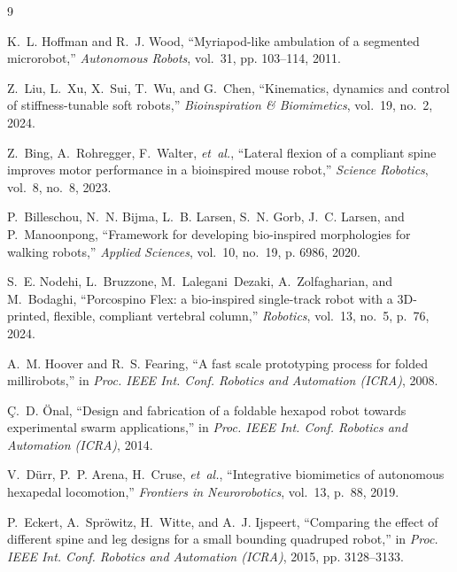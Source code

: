\documentclass[11pt, letterpaper]{article}
\begin{document}

\begin{thebibliography}{9}

K.~L. Hoffman and R.~J. Wood, ``Myriapod-like ambulation of a segmented
  microrobot,'' \emph{Autonomous Robots}, vol.~31, pp. 103--114, 2011.

Z.~Liu, L.~Xu, X.~Sui, T.~Wu, and G.~Chen, ``Kinematics, dynamics and control
  of stiffness-tunable soft robots,'' \emph{Bioinspiration \& Biomimetics},
  vol.~19, no.~2, 2024.

Z.~Bing, A.~Rohregger, F.~Walter, \emph{et~al.}, ``Lateral flexion of a
  compliant spine improves motor performance in a bioinspired mouse robot,''
  \emph{Science Robotics}, vol.~8, no.~8, 2023.

P.~Billeschou, N.~N. Bijma, L.~B. Larsen, S.~N. Gorb, J.~C. Larsen, and
  P.~Manoonpong, ``Framework for developing bio-inspired morphologies for
  walking robots,'' \emph{Applied Sciences}, vol.~10, no.~19, p. 6986, 2020.

S.~E. Nodehi, L.~Bruzzone, M.~Lalegani~Dezaki, A.~Zolfagharian, and M.~Bodaghi,
  ``Porcospino Flex: a bio-inspired single-track robot with a 3D-printed,
  flexible, compliant vertebral column,'' \emph{Robotics}, vol.~13, no.~5,
  p.~76, 2024.

A.~M. Hoover and R.~S. Fearing, ``A fast scale prototyping process for folded
  millirobots,'' in \emph{Proc. IEEE Int. Conf. Robotics and Automation
  (ICRA)}, 2008.

{\c{C}}.~D. \"{O}nal, ``Design and fabrication of a foldable hexapod robot
  towards experimental swarm applications,'' in \emph{Proc. IEEE Int. Conf.
  Robotics and Automation (ICRA)}, 2014.

V.~D{\"u}rr, P.~P. Arena, H.~Cruse, \emph{et~al.}, ``Integrative biomimetics of
  autonomous hexapedal locomotion,'' \emph{Frontiers in Neurorobotics},
  vol.~13, p.~88, 2019.

P.~Eckert, A.~Spr{\"o}witz, H.~Witte, and A.~J. Ijspeert, ``Comparing the
  effect of different spine and leg designs for a small bounding quadruped
  robot,'' in \emph{Proc. IEEE Int. Conf. Robotics and Automation (ICRA)},
  2015, pp. 3128--3133.

\end{thebibliography}
\end{document}
